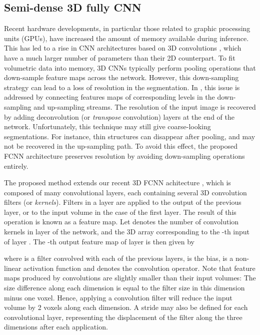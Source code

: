 \documentclass[twoside,espcrc2]{elsarticle}
\newcommand{\vold}[1]{}
\begin{document}
\subsection{Semi-dense 3D fully CNN}
\label{ssec:semi-dense}



Recent hardware developments, in particular those related to graphic processing units (GPUs), have increased the amount of memory available during inference. This has led to a rise in CNN architectures based on 3D convolutions \cite{kamnitsas2017efficient,dou20163d,milletari2016v,lu2017automatic}, which have a much larger number of parameters than their 2D counterpart. To fit volumetric data into memory, 3D CNNs typically perform pooling operations that down-sample feature maps across the network. However, this down-sampling strategy can lead to a loss of resolution in the segmentation. In \cite{long2015fully}, this issue is addressed by connecting features maps of corresponding levels in the down-sampling and up-sampling streams. The resolution of the input image is recovered by adding deconvolution (or \emph{transpose} convolution) layers at the end of the network. Unfortunately, this technique may still give coarse-looking segmentations. For instance, thin structures can disappear after pooling, and may not be recovered in the up-sampling path. To avoid this effect, the proposed FCNN architecture preserves resolution by avoiding down-sampling operations entirely. 

The proposed method extends our recent 3D FCNN achitecture \cite{DolzNeuro2017}, which is composed of many convolutional layers, each containing several 3D convolution filters (or \emph{kernels}). Filters in a layer are applied to the output of the previous layer, or to the input volume in the case of the first layer. The result of this operation is known as a feature map. Let  denotes the number of convolution kernels in layer  of the network, and  the 3D array corresponding to the -th input of layer . The -th output feature map of layer  is then given by
 
where  is a filter convolved with each of the previous layers,  is the bias,  is a non-linear activation function and  denotes the convolution operator. Note that feature maps produced by convolutions are slightly smaller than their input volumes: The size difference along each dimension is equal to the filter size in this dimension minus one voxel. Hence, applying a \vold{3} convolution filter will reduce the input volume by 2 voxels along each dimension. A stride may also be defined for each convolutional layer, representing the displacement of the filter along the three dimensions after each application.
\end{document}
